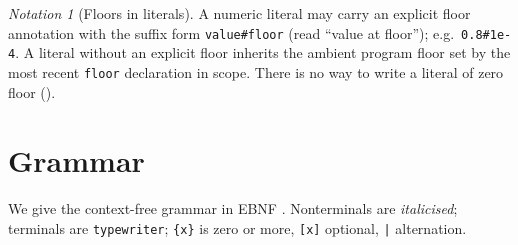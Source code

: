 \documentclass[11pt,a4paper]{article}
\theoremstyle{thmstyle}
\theoremstyle{definition}
\theoremstyle{remark}
\newtheorem{notation}[theorem]{Notation}
\newcommand{\shk}[1]{\texttt{#1}}
\begin{document}
\begin{notation}[Floors in literals]
\label{not:literals}
A numeric literal may carry an explicit floor annotation with the suffix
form \shk{value\#floor} (read ``value at floor''); e.g.\ \shk{0.8\#1e-4}.
A literal without an explicit floor inherits the ambient program floor set
by the most recent \shk{floor} declaration in scope. There is no way to
write a literal of zero floor ().
\end{notation}

\section{Grammar}
\label{sec:grammar}

We give the context-free grammar in EBNF \citep{ebnf2017}. Nonterminals
are \textit{italicised}; terminals are \shk{typewriter}; \shk{\{x\}} is
zero or more, \shk{[x]} optional, \shk{|} alternation.
\end{document}
